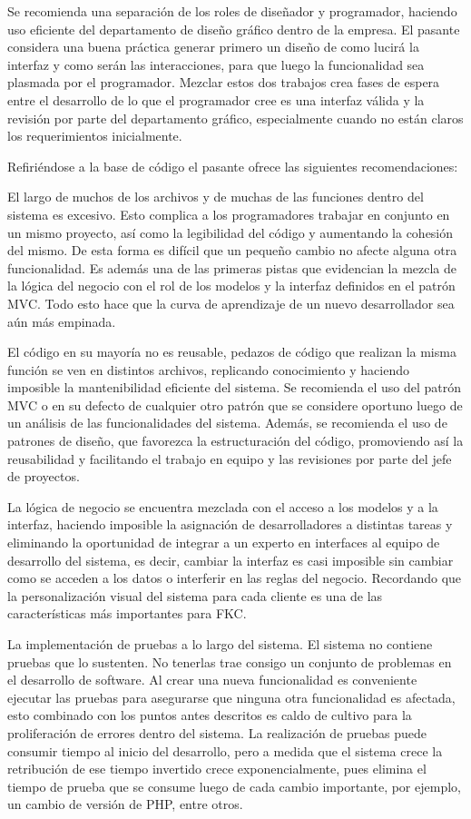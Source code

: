 Se recomienda una separación de los roles de diseñador y programador, haciendo uso eficiente del departamento de diseño gráfico dentro de la empresa. El pasante considera una buena práctica generar primero un diseño de como lucirá la interfaz y como serán las interacciones, para que luego la funcionalidad sea plasmada por el programador. Mezclar estos dos trabajos crea fases de espera entre el desarrollo de lo que el programador cree es una interfaz válida y la revisión por parte del departamento gráfico, especialmente cuando no están claros los requerimientos inicialmente.

Refiriéndose a la base de código el pasante ofrece las siguientes recomendaciones:

El largo de muchos de los archivos y de muchas de las funciones dentro del sistema es excesivo. Esto complica a los programadores trabajar en conjunto en un mismo proyecto, así como la legibilidad del código y aumentando la cohesión del mismo. De esta forma es difícil que un pequeño cambio no afecte alguna otra funcionalidad. Es además una de las primeras pistas que evidencian la mezcla de la lógica del negocio con el rol de los modelos y la interfaz definidos en el patrón \gls{MVC}. Todo esto hace que la curva de aprendizaje de un nuevo desarrollador sea aún más empinada.

El código en su mayoría no es reusable, pedazos de código que realizan la misma función se ven en distintos archivos, replicando conocimiento y haciendo imposible la mantenibilidad eficiente del sistema. Se recomienda el uso del patrón \gls{MVC} o en su defecto de cualquier otro patrón que se considere oportuno luego de un análisis de las funcionalidades del sistema. Además, se recomienda el uso de patrones de diseño, que favorezca la estructuración del código, promoviendo así la reusabilidad y facilitando el trabajo en equipo y las revisiones por parte del jefe de proyectos.

La lógica de negocio se encuentra mezclada con el acceso a los modelos y a la interfaz, haciendo imposible la asignación de desarrolladores a distintas tareas y eliminando la oportunidad de integrar a un experto en interfaces al equipo de desarrollo del sistema, es decir, cambiar la interfaz es casi imposible sin cambiar como se acceden a los datos o interferir en las reglas del negocio. Recordando que la personalización visual del sistema para cada cliente es una de las características más importantes para FKC.

La implementación de pruebas a lo largo del sistema. El sistema no contiene pruebas que lo sustenten. No tenerlas trae consigo un conjunto de problemas en el desarrollo de software. Al crear una nueva funcionalidad es conveniente ejecutar las pruebas para asegurarse que ninguna otra funcionalidad es afectada, esto combinado con los puntos antes descritos es caldo de cultivo para la proliferación de errores dentro del sistema. La realización de pruebas puede consumir tiempo al inicio del desarrollo, pero a medida que el sistema crece la retribución de ese tiempo invertido crece exponencialmente, pues elimina el tiempo de prueba que se consume luego de cada cambio importante, por ejemplo, un cambio de versión de PHP, entre otros.

